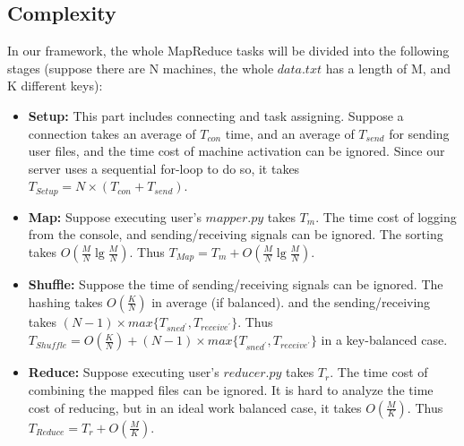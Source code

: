 \documentclass{article}
\begin{document}
	\subsection{Complexity}
		In our framework, the whole MapReduce tasks will be divided into the following stages (suppose there are N machines, the whole $data.txt$ has a length of M, and K different keys):
		\begin{itemize}
			\item \textbf{Setup: }This part includes connecting and task assigning. Suppose a connection takes an average of $T_{con}$ time, and an average of $T_{send}$ for sending user files, and the time cost of machine activation can be ignored. Since our server uses a sequential for-loop to do so, it takes $T_{Setup}=N\times (T_{con} + T_{send}).$
			\item \textbf{Map: }Suppose executing user's $mapper.py$ takes $T_{m}$. The time cost of logging from the console, and sending/receiving signals can be ignored. The sorting takes $O(\frac{M}{N}\lg \frac{M}{N})$. Thus $T_{Map}=T_{m}+O(\frac{M}{N}\lg \frac{M}{N})$.
			\item \textbf{Shuffle: } Suppose the time of sending/receiving signals can be ignored. The hashing takes $O(\frac{K}{N})$ in average (if balanced). and the sending/receiving takes $(N-1)\times max\{ T_{sned^{'}}, T_{receive^{'}}\}$. Thus $T_{Shuffle}=O(\frac{K}{N})+(N-1)\times max\{ T_{sned^{'}}, T_{receive^{'}}\}$ in a key-balanced case.
			\item \textbf{Reduce: } Suppose executing user's $reducer.py$ takes $T_{r}$. The time cost of combining the mapped files can be ignored. It is hard to analyze the time cost of reducing, but in an ideal work balanced case, it takes $O(\frac{M}{K})$. Thus $T_{Reduce} = T_{r} + O(\frac{M}{K})$.
			
		\end{itemize}
\end{document}
